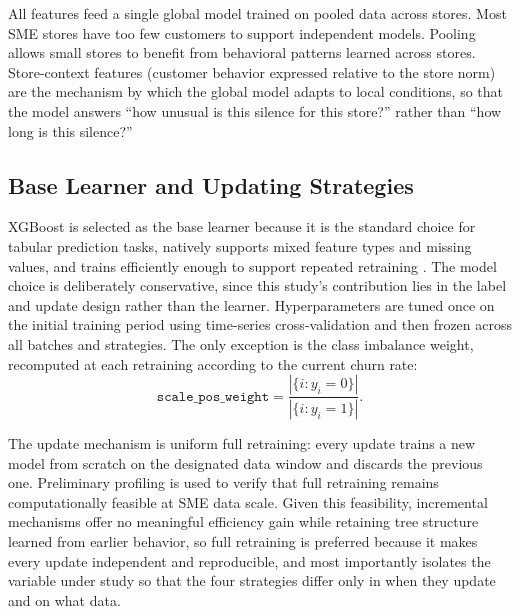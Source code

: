 All features feed a single global model trained on pooled data across stores. Most SME stores have too few customers to support independent models. Pooling allows small stores to benefit from behavioral patterns learned across stores. Store-context features (customer behavior expressed relative to the store norm) are the mechanism by which the global model adapts to local conditions, so that the model answers ``how unusual is this silence for this store?'' rather than ``how long is this silence?''

\subsection{Base Learner and Updating Strategies}

XGBoost is selected as the base learner because it is the standard choice for tabular prediction tasks, natively supports mixed feature types and missing values, and trains efficiently enough to support repeated retraining \cite{chen2016}. The model choice is deliberately conservative, since this study's contribution lies in the label and update design rather than the learner. Hyperparameters are tuned once on the initial training period using time-series cross-validation and then frozen across all batches and strategies. The only exception is the class imbalance weight, recomputed at each retraining according to the current churn rate:
\begin{equation}
  \texttt{scale\_pos\_weight} = \frac{|\{i : y_i = 0\}|}{|\{i : y_i = 1\}|}.
  \label{eq:scale-pos-weight}
\end{equation}

The update mechanism is uniform full retraining: every update trains a new model from scratch on the designated data window and discards the previous one. Preliminary profiling is used to verify that full retraining remains computationally feasible at SME data scale. Given this feasibility, incremental mechanisms offer no meaningful efficiency gain while retaining tree structure learned from earlier behavior, so full retraining is preferred because it makes every update independent and reproducible, and most importantly isolates the variable under study so that the four strategies differ only in when they update and on what data.


